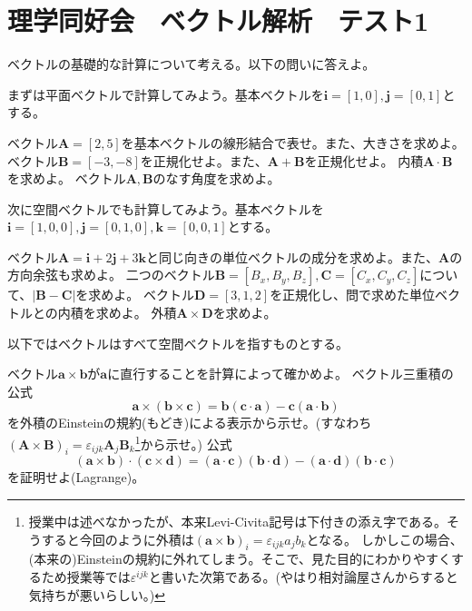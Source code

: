 \documentclass[a4j,dvipdfmx]{jsarticle}
\begin{document}
    \part*{理学同好会　ベクトル解析　テスト1}
        ベクトルの基礎的な計算について考える。以下の問いに答えよ。
        \begin{qparts}
            \qpart まずは平面ベクトルで計算してみよう。基本ベクトルを$\bm{i}=[1,0],\bm{j}=[0,1]$とする。
            \begin{qlist}
                \qitem ベクトル$\bm{A}=[2,5]$を基本ベクトルの線形結合で表せ。また、大きさを求めよ。
                \qitem ベクトル$\bm{B}=[-3,-8]$を正規化せよ。また、$\bm{A}+\bm{B}$を正規化せよ。
                \qitem 内積$\bm{A}\cdot \bm{B}$を求めよ。
                \qitem ベクトル$\bm{A},\bm{B}$のなす角度を求めよ。
            \end{qlist}
            \qpart 次に空間ベクトルでも計算してみよう。基本ベクトルを$\bm{i}=[1,0,0],\bm{j}=[0,1,0],\bm{k}=[0,0,1]$とする。
            \begin{qlist}
                \qitem ベクトル$\bm{A}=\bm{i}+2\bm{j}+3\bm{k}$と同じ向きの単位ベクトルの成分を求めよ。また、$\bm{A}$の方向余弦も求めよ。\label{q:1ii5}
                \qitem 二つのベクトル$\bm{B}=[B_x,B_y,B_z],\bm{C}=[C_x,C_y,C_z]$について、$|\bm{B}-\bm{C}|$を求めよ。
                \qitem ベクトル$\bm{D}=[3,1,2]$を正規化し、問で求めた単位ベクトルとの内積を求めよ。
                \qitem 外積$\bm{A}\times \bm{D}$を求めよ。
            \end{qlist}
            \qpart 以下ではベクトルはすべて空間ベクトルを指すものとする。
            \begin{qlist}
                \qitem ベクトル$\bm{a}\times \bm{b}$が$\bm{a}$に直行することを計算によって確かめよ。
                \qitem ベクトル三重積の公式
                \begin{equation}
                    \bm{a}\times(\bm{b}\times\bm{c})=\bm{b}(\bm{c}\cdot\bm{a})-\bm{c}(\bm{a}\cdot\bm{b})
                \end{equation}
                を外積のEinsteinの規約(もどき)による表示から示せ。(すなわち$(\bm{A}\times\bm{B})_i=\varepsilon_{ijk}\bm{A}_j\bm{B}_k$\footnote{授業中は述べなかったが、本来Levi-Civita記号は下付きの添え字である。そうすると今回のように外積は$(\bm{a}\times\bm{b})_i=\varepsilon_{ijk}a_jb_k$となる。
                しかしこの場合、(本来の)Einsteinの規約に外れてしまう。そこで、見た目的にわかりやすくするため授業等では$\varepsilon^{ijk}$と書いた次第である。(やはり相対論屋さんからすると気持ちが悪いらしい。)}から示せ。)
                \qitem 公式
                \begin{equation}
                    (\bm{a}\times\bm{b})\cdot(\bm{c}\times\bm{d}) = (\bm{a}\cdot\bm{c})(\bm{b}\cdot\bm{d})-(\bm{a}\cdot\bm{d})(\bm{b}\cdot\bm{c})
                \end{equation}
                を証明せよ(Lagrange)。
            \end{qlist}
        \end{qparts}
\end{document}
